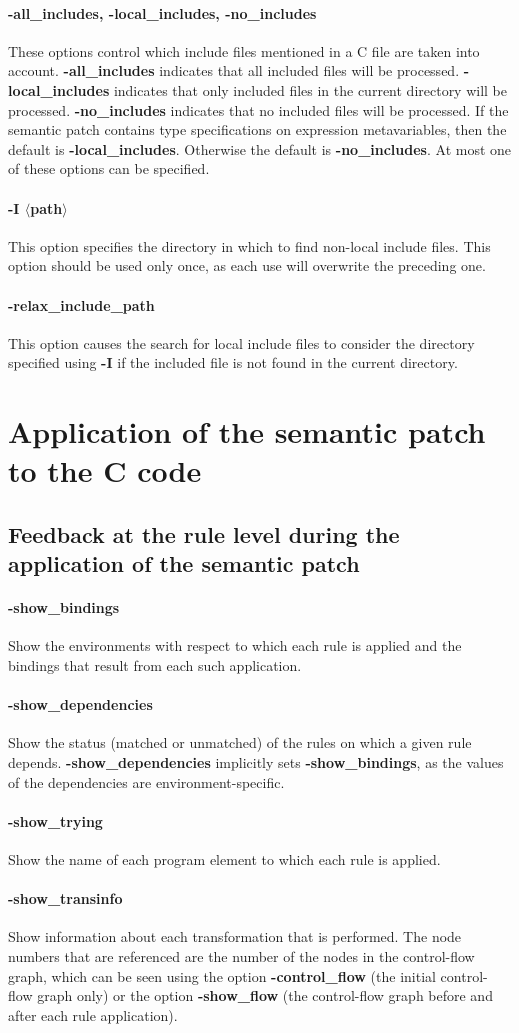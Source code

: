 \documentclass{article}
\newcommand{\normal}[2]{\paragraph*{\makebox[0in][r]{\BigLowerDiamond\,\,} {{#1}}} {#2}}
\newcommand{\rare}[2]{\paragraph*{\makebox[0in][r]{\BigDiamondshape\,\,} {{#1}}} {#2}}
\begin{document}
\normal{-all\_includes, -local\_includes, -no\_includes}{
These options control which include files mentioned in a C file are taken into
account.  {\bf -all\_includes} indicates that all included files will be
processed.  {\bf -local\_includes} indicates that only included files in
the current directory will be processed.  {\bf -no\_includes} indicates
that no included files will be processed.  If the semantic patch contains
type specifications on expression metavariables, then the default is {\bf
-local\_includes}.  Otherwise the default is {\bf -no\_includes}.  At most
one of these options can be specified.}

\normal{-I $\langle$path$\rangle$}{ This option specifies the directory in
  which to find non-local include files.  This option should be used only
  once, as each use will overwrite the preceding one.}

\rare{-relax\_include\_path}{This option causes the search for local
  include files to consider the directory specified using {\bf -I} if the
  included file is not found in the current directory.}

\section{Application of the semantic patch to the C code}

\subsection{Feedback at the rule level during the application of the
  semantic patch}

\normal{-show\_bindings}{
Show the environments with respect to which each rule is applied and the
bindings that result from each such application.}

\normal{-show\_dependencies}{ Show the status (matched or unmatched) of the
rules on which a given rule depends.  {\bf -show\_dependencies} implicitly
sets {\bf -show\_bindings}, as the values of the dependencies are
environment-specific.}

\normal{-show\_trying}{
Show the name of each program element to which each rule is applied.}

\normal{-show\_transinfo}{
Show information about each transformation that is performed.
The node numbers that are referenced are the number of the nodes in the
control-flow graph, which can be seen using the option {\bf -control\_flow}
(the initial control-flow graph only) or the option {\bf -show\_flow} (the
control-flow graph before and after each rule application).}
\end{document}
